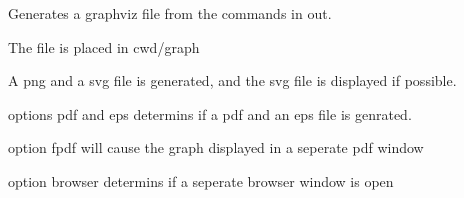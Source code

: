 \documentclass[letterpaper,10pt,english]{sphinxmanual}
\begin{document}
\begin{fulllineitems}
\begin{fulllineitems}
\label{\detokenize{core/modelclass:modelclass.Graph_Draw_Mixin.display_graph}}
\pysigstartsignatures
{}
\pysigstopsignatures
\sphinxAtStartPar
Generates a graphviz file from the commands in out.

\sphinxAtStartPar
The file is placed in cwd/graph

\sphinxAtStartPar
A png and a svg file is generated, and the svg file is displayed if possible.

\sphinxAtStartPar
options pdf and eps determins if a pdf and an eps file is genrated.

\sphinxAtStartPar
option fpdf will cause the graph displayed in a seperate pdf window

\sphinxAtStartPar
option browser determins if a seperate browser window is open

\end{fulllineitems}


\end{fulllineitems}

\end{document}
